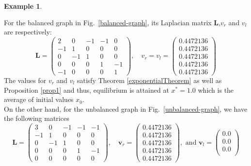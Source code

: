 \documentclass[10pt,a4paper]{article}
\theoremstyle{plain}
\theoremstyle{definition}
\newtheorem{exa}[subsection]{Example}
\begin{document}
\begin{exa}
\begin{figure}[H]
      		\label{unbalanced-diffusion}		
      	\end{figure} 
   For the balanced graph in Fig.~\ref{balanced-graph}, its Laplacian matrix $\mathbf{L}$,$v_r$ and $v_l$ are respectively:
   \begin{equation*}
   \mathbf{L} = \begin{pmatrix}
    2 &  0 & -1 & -1 &  0 \\
   -1 & 1  & 0  & 0  &  0 \\ 
    0 & -1 & 1  & 0  &  0 \\
    0 &  0 & 0  & 1  & -1 \\
    -1&  0 & 0  & 0  & 1
   \end{pmatrix}, \quad 
   v_r = v_l = \begin{pmatrix}
   0.4472136 \\  
   0.4472136 \\  
   0.4472136 \\ 
   0.4472136 \\
   0.4472136
   \end{pmatrix}
   \end{equation*} 
   The values for $v_r$ and $v_l$ satisfy Theorem \ref{exponentialTheorem} as well as Proposition \ref{prop1} and thus, equilibrium is attained at $x^*=1.0$ which is the average of initial values $x_0$.\\
   On the other hand, for the unbalanced graph in Fig.~\ref{unbalanced-graph}, we have the following matrices
    \begin{equation*}
   \mathbf{L} = \begin{pmatrix}
    3 &  0 & -1 & -1 & -1 \\
   -1 &  1 & 0  & 0  & 0  \\
    0 & -1 & 1  & 0  & 0  \\
    0 &  0 & 0  & 1  & -1 \\
    0 &  0 & 0  & 0  & 0
   \end{pmatrix}, \quad 
   \mathbf{v}_r = \begin{pmatrix}
   0.4472136 \\  
   0.4472136 \\  
   0.4472136 \\ 
   0.4472136 \\
   0.4472136
   \end{pmatrix}, \text{ and }
   \mathbf{v}_l = \begin{pmatrix}
   0.0 \\  
   0.0 \\  
   0.0 \\ 

\end{pmatrix}
\end{equation*}
\end{exa}
\end{document}

